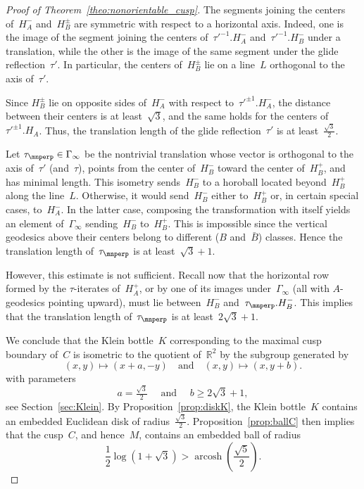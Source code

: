 \documentclass[11pt,reqno]{amsart}
\theoremstyle{definition}
\numberwithin{equation}{section}
\newcommand\R {{\mathbb R}}
\DeclareMathOperator{\arcosh}{arcosh}
\numberwithin{equation}{section}
\begin{document}
\begin{proof}[Proof of Theorem~\ref{theo:nonorientable_cusp}]
\medskip

The segments joining the centers of~$H_A^-$ and~$H_B^\pm$ are symmetric with respect to a horizontal axis.
Indeed, one is the image of the segment joining the centers of~$\tau'^{-1}.H_A^-$ and~$\tau'^{-1}.H_B^-$ under a translation, while the other is the image of the same segment under the glide reflection~$\tau'$.
In particular, the centers of~$H_B^\pm$ lie on a line~$L$ orthogonal to the axis of~$\tau'$.

Since $H_B^\pm$ lie on opposite sides of~$H_A^-$ with respect to~$\tau'^{\pm 1}.H_A^-$, the distance between their centers is at least~$\sqrt{3}$, and the same holds for the centers of~$\tau'^{\pm 1}.H_A$.
Thus, the translation length of the glide reflection~$\tau'$ is at least~$\frac{\sqrt{3}}{2}$.

\medskip


Let $\tau_\mnperp \in \Gamma_\infty$ be the nontrivial translation whose vector is orthogonal to the axis of~$\tau'$ (and~$\tau$), points from the center of~$H_B^-$ toward the center of~$H_B^+$, and has minimal length.
This isometry sends~$H_B^-$ to a horoball located beyond~$H_B^+$ along the line~$L$.
Otherwise, it would send~$H_B^-$ either to~$H_B^+$ or, in certain special cases, to~$H_A^-$.
In the latter case, composing the transformation with itself yields an element of~$\Gamma_\infty$ sending~$H_B^-$ to~$H_B^+$.
This is impossible since the vertical geodesics above their centers belong to different ($B$ and~$\bar B$) classes.
Hence the translation length of~$\tau_\mnperp$ is at least~$\sqrt{3}+1$.

However, this estimate is not sufficient.
Recall now that the horizontal row formed by the $\tau$-iterates of~$H_A^+$, or by one of its images under~$\Gamma_\infty$ (all with $A$-geodesics pointing upward), must lie between~$H_B^-$ and~$\tau_\mnperp.H_B^-$.
This implies that the translation length of~$\tau_\mnperp$ is at least~$2 \sqrt{3}+1$.

\medskip

We conclude that  the Klein bottle~$K$ corresponding to the maximal cusp boundary of~$C$ is isometric to the quotient of~$\R^2$ by the subgroup generated by
\begin{equation} \label{eq:ab}
(x,y) \mapsto \left( x+a,-y \right) \quad \text{and} \quad (x,y) \mapsto (x,y+b).
\end{equation}
with parameters
\[
a=\tfrac{\sqrt{3}}{2} \quad \mbox{ and } \quad b \geq 2 \sqrt{3}+1,
\] 
see Section~\ref{sec:Klein}.
By Proposition~\ref{prop:diskK}, the Klein bottle~$K$ contains an embedded Euclidean disk of radius~$\frac{\sqrt{3}}{2}$.
Proposition~\ref{prop:ballC} then implies that the cusp~$C$, and hence~$M$, contains an embedded ball of radius
\[
\frac{1}{2} \log \left( 1+\sqrt{3} \right) > \arcosh \left( \frac{\sqrt{5}}{2} \right).
\]


\end{proof}
\end{document}
